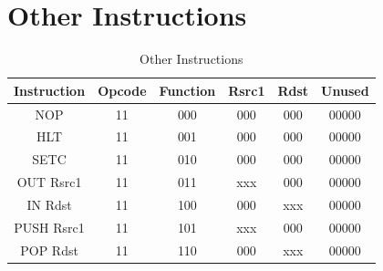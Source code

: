 \documentclass{report}
\begin{document}
\section*{Other Instructions}
\begin{table}[H]
    \centering
    \begin{tabular}{|c|c|c|c|c|c|}
    \hline
    \textbf{Instruction} & \textbf{Opcode} & \textbf{Function} & \textbf{Rsrc1} & \textbf{Rdst} & \textbf{Unused} \\ \hline
    NOP & 11 & 000 & \cellcolor{red!20}000 & \cellcolor{red!20}000 & \cellcolor{red!20}00000 \\ \hline
    HLT & 11 & 001 & \cellcolor{red!20}000 & \cellcolor{red!20}000 & \cellcolor{red!20}00000 \\ \hline
    SETC & 11 & 010 & \cellcolor{red!20}000 & \cellcolor{red!20}000 & \cellcolor{red!20}00000 \\ \hline
    OUT Rsrc1 & 11 & 011 & xxx & \cellcolor{red!20}000 & \cellcolor{red!20}00000 \\ \hline
    IN Rdst & 11 & 100 & \cellcolor{red!20}000 & xxx & \cellcolor{red!20}00000 \\ \hline
    PUSH Rsrc1 & 11 & 101 & xxx & \cellcolor{red!20}000 & \cellcolor{red!20}00000 \\ \hline
    POP Rdst & 11 & 110 & \cellcolor{red!20}000 & xxx & \cellcolor{red!20}00000 \\ \hline
    \end{tabular}
    \caption{Other Instructions}
    \label{tab:other-instructions}
\end{table}
\end{document}
